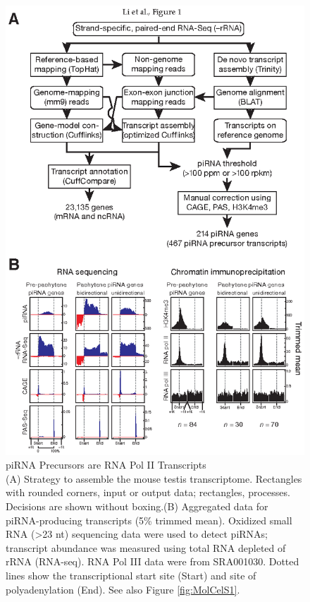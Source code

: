     \begin{figure}[htbp] %
      \centering 
      \includegraphics{Figures/MolCel/MolCel2013_Fig1.eps}
      \caption[piRNA Precursors are RNA Pol II Transcripts]
      {
        piRNA Precursors are RNA Pol II Transcripts\\[0.25cm]
        (A) Strategy to assemble the mouse testis transcriptome. Rectangles with rounded corners, input or output data; rectangles, processes. Decisions are shown without boxing.(B) Aggregated data for piRNA-producing transcripts (5\% trimmed mean). Oxidized small RNA (>23 nt) sequencing data were used to detect piRNAs; transcript abundance was measured using total RNA depleted of rRNA (RNA-seq). RNA Pol III data were from SRA001030. Dotted lines show the transcriptional start site (Start) and site of polyadenylation (End). See also Figure \ref{fig:MolCelS1}.
        }
      \label{fig:MolCelF1}
      \end{figure}
